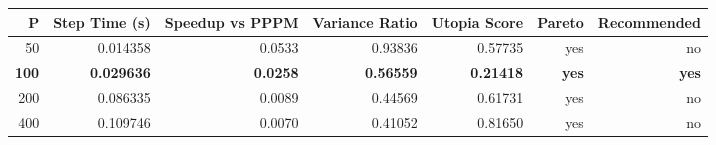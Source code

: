 \begin{tabular}{rrrrrrr}
\toprule
P & Step Time (s) & Speedup vs PPPM & Variance Ratio & Utopia Score & Pareto & Recommended \\
\midrule
50 & 0.014358 & 0.0533 & 0.93836 & 0.57735 & yes & no \\
\textbf{100} & \textbf{0.029636} & \textbf{0.0258} & \textbf{0.56559} & \textbf{0.21418} & \textbf{yes} & \textbf{yes} \\
200 & 0.086335 & 0.0089 & 0.44569 & 0.61731 & yes & no \\
400 & 0.109746 & 0.0070 & 0.41052 & 0.81650 & yes & no \\
\bottomrule
\end{tabular}
